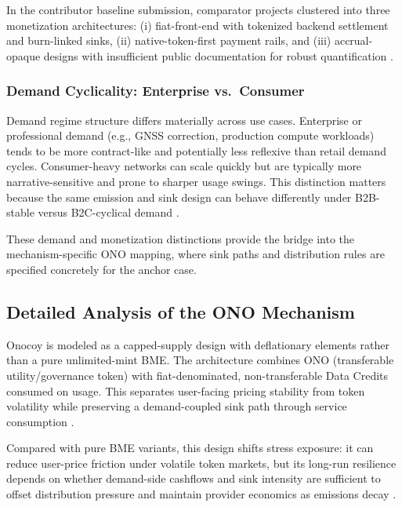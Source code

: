 In the contributor baseline submission, comparator projects clustered into three monetization architectures: (i) fiat-front-end with tokenized backend settlement and burn-linked sinks, (ii) native-token-first payment rails, and (iii) accrual-opaque designs with insufficient public documentation for robust quantification \cite{Ballandies2023, Lin2024}.

\subsubsection{Demand Cyclicality: Enterprise vs.\ Consumer}
Demand regime structure differs materially across use cases. Enterprise or professional demand (e.g., GNSS correction, production compute workloads) tends to be more contract-like and potentially less reflexive than retail demand cycles. Consumer-heavy networks can scale quickly but are typically more narrative-sensitive and prone to sharper usage swings. This distinction matters because the same emission and sink design can behave differently under B2B-stable versus B2C-cyclical demand \cite{Lin2024, Ho2022}.

These demand and monetization distinctions provide the bridge into the mechanism-specific ONO mapping, where sink paths and distribution rules are specified concretely for the anchor case.

\subsection{Detailed Analysis of the ONO Mechanism}
\label{subsec:ono_mechanism}
Onocoy is modeled as a capped-supply design with deflationary elements rather than a pure unlimited-mint BME. The architecture combines ONO (transferable utility/governance token) with fiat-denominated, non-transferable Data Credits consumed on usage. This separates user-facing pricing stability from token volatility while preserving a demand-coupled sink path through service consumption \cite{OnocoyWhitepaper301, OnocoyToken}.

Compared with pure BME variants, this design shifts stress exposure: it can reduce user-price friction under volatile token markets, but its long-run resilience depends on whether demand-side cashflows and sink intensity are sufficient to offset distribution pressure and maintain provider economics as emissions decay \cite{OnocoyWhitepaper301, Braakman2022}.

